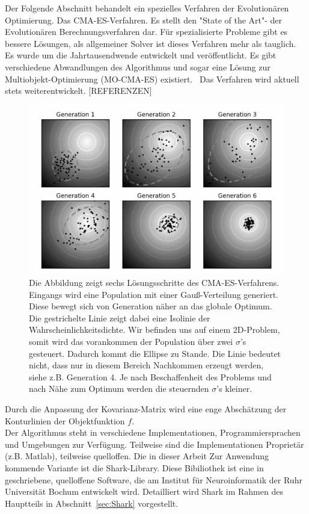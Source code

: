 Der Folgende Abschnitt behandelt ein spezielles Verfahren der Evolutionären Optimierung. Das CMA-ES-Verfahren. Es stellt den "State of the Art"- der Evolutionären Berechnungsverfahren dar. Für spezialisierte Probleme gibt es bessere Lösungen, als allgemeiner Solver ist dieses Verfahren mehr als tauglich. Es wurde um die Jahrtausendwende entwickelt und veröffentlicht. Es gibt verschiedene Abwandlungen des Algorithmus und sogar eine Lösung zur Multiobjekt-Optimierung (MO-CMA-ES) existiert.~\cite{HansenMOO:1} Das Verfahren wird aktuell stets weiterentwickelt. [REFERENZEN]\\
%
\begin{figure} [ht!]
\centering
         \caption[Konzept direkter Optimierung mittels CMA-ES]{Die Abbildung zeigt sechs Lösungsschritte des CMA-ES-Verfahrens. Eingangs wird eine Population mit einer Gauß-Verteilung generiert. Diese bewegt sich von Generation näher an das globale Optimum. Die gestrichelte Linie zeigt dabei eine Isolinie der Wahrscheinlichkeitsdichte. Wir befinden uns auf einem 2D-Problem, somit wird das vorankommen der Population über zwei $\sigma$'s gesteuert. Dadurch kommt die Ellipse zu Stande. Die Linie bedeutet nicht, dass nur in diesem Bereich Nachkommen erzeugt werden, siehe z.B. Generation 4. Je nach Beschaffenheit des Problems und nach Nähe zum Optimum werden die steuernden $\sigma$'s kleiner. }
         \label{fig:conecpt_cma.es}
         \vspace{0.5cm}
         \includegraphics[width=\textwidth]{img/CMA-ES_algorithm.png}
%      
\end{figure}

%
Durch die Anpassung der Kovarianz-Matrix wird eine enge Abschätzung der Konturlinien der Objektfunktion $f$.\\

%
Der Algorithmus steht in verschiedene Implementationen, Programmiersprachen und Umgebungen zur Verfügung. Teilweise sind die Implementationen Proprietär (z.B. Matlab), teilweise quelloffen. Die in dieser Arbeit Zur Anwendung kommende Variante ist die Shark-Library. Diese Bibiliothek ist eine in \cpp geschriebene, quelloffene Software, die am Institut für Neuroinformatik der Ruhr Universität Bochum entwickelt wird. Detailliert wird Shark im Rahmen des Hauptteils in Abschnitt~\ref{sec:Shark} vorgestellt.
